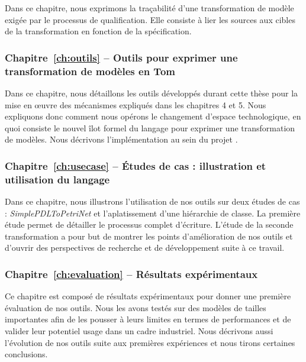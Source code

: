Dans ce chapitre, nous exprimons la traçabilité d'une transformation de modèle
exigée par le processus de qualification. Elle consiste à lier les sources aux
cibles de la transformation en fonction de la spécification.

\subsubsection{Chapitre~\ref{ch:outils} -- Outils pour exprimer une transformation de modèles en Tom}

Dans ce chapitre, nous détaillons les outils développés durant cette thèse pour
la mise en œuvre des mécanismes expliqués dans les chapitres 4 et 5. Nous
expliquons donc comment nous opérons le changement d'espace technologique, en
quoi consiste le nouvel îlot formel du langage {\tom} pour exprimer une
transformation de modèles. Nous décrivons l'implémentation au sein du projet
{\tom}.

\subsubsection{Chapitre~\ref{ch:usecase} -- Études de cas : illustration et utilisation du langage}

Dans ce chapitre, nous illustrons l'utilisation de nos outils sur deux études
de cas : \emph{SimplePDLToPetriNet} et l'aplatissement d'une hiérarchie de
classe. La première étude permet de détailler le processus complet d'écriture.
L'étude de la seconde transformation a pour but de montrer les points
d'amélioration de nos outils et d'ouvrir des perspectives de recherche et de
développement suite à ce travail.

\subsubsection{Chapitre~\ref{ch:evaluation} -- Résultats expérimentaux}

Ce chapitre est composé de résultats expérimentaux pour donner une première
évaluation de nos outils. Nous les avons testés sur des modèles de tailles
importantes afin de les pousser à leurs limites en termes de performances et de
valider leur potentiel usage dans un cadre industriel. Nous décrivons aussi
l'évolution de nos outils suite aux premières expériences et nous tirons
certaines conclusions.


